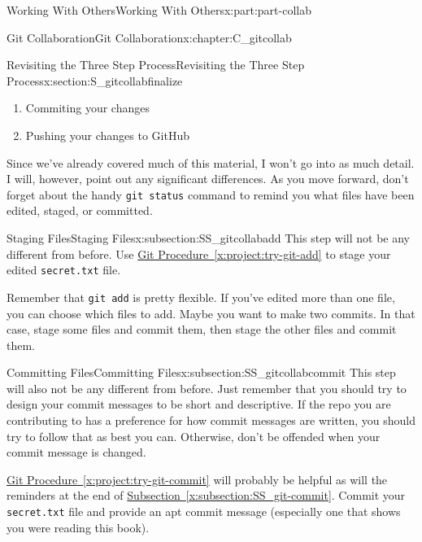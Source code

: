 \documentclass[oneside,10pt,]{book}
\newcommand{\xreffont}{\relax}
\newcommand{\mono}[1]{\texttt{#1}}
\begin{document}
\begin{partptx}{Working With Others}{}{Working With Others}{}{}{x:part:part-collab}
\begin{chapterptx}{Git Collaboration}{}{Git Collaboration}{}{}{x:chapter:C_gitcollab}
\begin{sectionptx}{Revisiting the Three Step Process}{}{Revisiting the Three Step Process}{}{}{x:section:S_gitcollabfinalize}
\begin{introduction}{}
\begin{enumerate}
\item{}Commiting your changes%
\item{}Pushing your changes to GitHub%
\end{enumerate}
%
\par
Since we've already covered much of this material, I won't go into as much detail. I will, however, point out any significant differences. As you move forward, don't forget about the handy \mono{git status} command to remind you what files have been edited, staged, or committed.%
\end{introduction}%
%
%
\typeout{************************************************}
\typeout{************************************************}
%
\begin{subsectionptx}{Staging Files}{}{Staging Files}{}{}{x:subsection:SS_gitcollabadd}
%
%
This step will not be any different from before. Use \hyperref[x:project:try-git-add]{Git Procedure~{\xreffont\ref{x:project:try-git-add}}} to stage your edited \mono{secret.txt} file.%
\par
Remember that \mono{git add} is pretty flexible. If you've edited more than one file, you can choose which files to add. Maybe you want to make two commits. In that case, stage some files and commit them, then stage the other files and commit them.%
\end{subsectionptx}
%
%
\typeout{************************************************}
\typeout{************************************************}
%
\begin{subsectionptx}{Committing Files}{}{Committing Files}{}{}{x:subsection:SS_gitcollabcommit}
%
%
This step will also not be any different from before. Just remember that you should try to design your commit messages to be short and descriptive. If the repo you are contributing to has a preference for how commit messages are written, you should try to follow that as best you can. Otherwise, don't be offended when your commit message is changed.%
\par
\hyperref[x:project:try-git-commit]{Git Procedure~{\xreffont\ref{x:project:try-git-commit}}} will probably be helpful as will the reminders at the end of \hyperref[x:subsection:SS_git-commit]{Subsection~{\xreffont\ref{x:subsection:SS_git-commit}}}. Commit your \mono{secret.txt} file and provide an apt commit message (especially one that shows you were reading this book).%
\end{subsectionptx}

\end{sectionptx}
\end{chapterptx}
\end{partptx}
\end{document}
